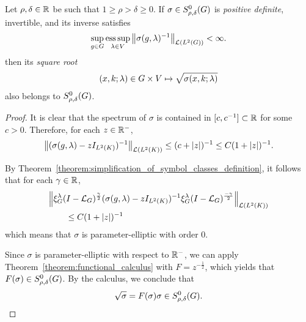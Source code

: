 \begin{lemma}
\label{lemma:square_root_of_a_symbol_of_order_zero}
    Let $\rho, \delta \in \R$ be such that $1 \geq \rho > \delta \geq 0$.
    If $\sigma \in \SymbolClass 0 {\rho, \delta}$ is \emph{positive definite},
    invertible,
    and its inverse satisfies
    \begin{align*}
        \sup_{g \in \Group} \esssup_{\lambda \in \VectorSpace} \norm [\Lin {\Lebesgue 2 \Group}] {\sigma(g, \lambda)^{-1}} < \infty.
    \end{align*}
    then its \emph{square root}
    \begin{align*}
        (x, k; \lambda) \in \Group \times \VectorSpace \mapsto \sqrt{\sigma(x, k; \lambda)}
    \end{align*}
    also belongs to $\SymbolClass 0 {\rho, \delta}$.
\end{lemma}
\begin{proof}
    It is clear that the spectrum of $\sigma$ is contained in $[c, c^{-1}] \subset \R$ for some $c > 0$.
    Therefore, for each $z \in \R^{-}$,
    \begin{align*}
        \norm [\Lin {\Lebesgue 2 \CompactGroup}] {(\sigma(g, \lambda) - z \Id {\Lebesgue 2 \CompactGroup})^{-1}}
        \leq (c + \abs z)^{-1}
        \leq C(1 + \abs z)^{-1}.
    \end{align*}

    By Theorem~\ref{theorem:simplification_of_symbol_classes_definition},
    it follows that for each $\gamma \in \R$,
    \begin{align*}
        &\norm [\Lin {\Lebesgue 2 \CompactGroup}] {
            \Rep \lambda \BesselPotential \gamma
            (\sigma(g, \lambda) - z \Id {\Lebesgue 2 \CompactGroup})^{-1}
            \Rep \lambda \BesselPotential {-\gamma}
        }\\
        &\qquad \leq C(1 + \abs z)^{-1}
    \end{align*}
    which means that $\sigma$ is parameter-elliptic with order $0$.

    Since $\sigma$ is parameter-elliptic with respect to $\R^-$,
    we can apply Theorem~\ref{theorem:functional_calculus} with $F = z^{-\frac 1 2}$,
    which yields that $F(\sigma) \in \SymbolClass {0} {\rho, \delta}$.
    By the calculus,
    we conclude that
    \begin{align*}
        \sqrt \sigma = F(\sigma) \sigma \in \SymbolClass 0 {\rho, \delta}.
    \end{align*}
\end{proof}

